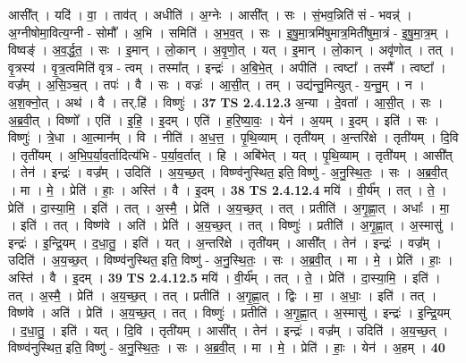 \documentclass[17pt]{extarticle}
\begin{document}
                  आसी᳚त् । यदि॑ । वा॒ । ताव॑त् । अधीति॑ । अ॒ग्नेः । आसी᳚त् ।   सः । सं॒भव॒न्निति॑ सं - भवन्न्॑ । अ॒ग्नीषोमा॒वित्य॒ग्नी - सोमौ᳚ । अ॒भि । समिति॑ । अ॒भ॒व॒त् । सः । इ॒षु॒मा॒त्रमि॑षुमात्र॒मिती॑षुमा॒त्रं - इ॒षु॒मा॒त्र॒म् । विष्वङ्॑ । अ॒व॒र्द्ध॒त॒ । सः । इ॒मान् । लो॒कान् । अ॒वृ॒णो॒त् । यत् । इ॒मान् । लो॒कान् । अवृ॑णोत् । तत् । वृ॒त्रस्य॑ । वृ॒त्र॒त्वमिति॑ वृत्र - त्वम् । तस्मा᳚त् । इन्द्रः॑ । अ॒बि॒भे॒त् । अपीति॑ । त्वष्टा᳚ । तस्मै᳚ । त्वष्टा᳚ । वज्र᳚म् । अ॒सि॒ञ्च॒त् । तपः॑ । वै । सः । वज्रः॑ । आ॒सी॒त् । तम् । उद्य॑न्तु॒मित्युत् -   य॒न्तु॒म् । न । अ॒श॒क्नो॒त् । अथ॑ । वै । तर्.हि॑ । विष्णुः॑ । \textbf{  37} \newline
                  \newline
                                \textbf{ TS 2.4.12.3} \newline
                  अ॒न्या । दे॒वता᳚ । आ॒सी॒त् । सः । अ॒ब्र॒वी॒त् । विष्णो᳚ । एति॑ । इ॒हि॒ । इ॒दम् । एति॑ । ह॒रि॒ष्या॒वः॒ । येन॑ । अ॒यम् । इ॒दम् । इति॑ । सः । विष्णुः॑ । त्रे॒धा । आ॒त्मान᳚म् । वि । नीति॑ । अ॒ध॒त्त॒ । पृ॒थि॒व्याम् । तृती॑यम् । अ॒न्तरि॑क्षे । तृती॑यम् । दि॒वि । तृती॑यम् । अ॒भि॒प॒र्या॒व॒र्तादित्य॑भि - प॒र्या॒व॒र्तात् । हि । अबि॑भेत् । यत् । पृ॒थि॒व्याम् । तृती॑यम् । आसी᳚त् । तेन॑ । इन्द्रः॑ । वज्र᳚म् । उदिति॑ । अ॒य॒च्छ॒त् । विष्ण्व॑नुस्थित॒ इति॒ विष्णु॑ - अ॒नु॒स्थि॒तः॒ । सः । अ॒ब्र॒वी॒त् । मा । मे॒ । प्रेति॑ । हाः॒ । अस्ति॑ । वै । इ॒दम् । \textbf{  38} \newline
                  \newline
                                \textbf{ TS 2.4.12.4} \newline
                  मयि॑ । वी॒र्य᳚म् । तत् । ते॒ । प्रेति॑ । दा॒स्या॒मि॒ । इति॑ ।   तत् । अ॒स्मै॒ । प्रेति॑ । अ॒य॒च्छ॒त् । तत् । प्रतीति॑ । अ॒गृ॒ह्णा॒त् । अधाः᳚ । मा॒ । इति॑ । तत् । विष्ण॑वे । अति॑ । प्रेति॑ । अ॒य॒च्छ॒त् । तत् । विष्णुः॑ । प्रतीति॑ । अ॒गृ॒ह्णा॒त् । अ॒स्मासु॑ । इन्द्रः॑ । इ॒न्द्रि॒यम् । द॒धा॒तु॒ । इति॑ । यत् । अ॒न्तरि॑क्षे । तृती॑यम् । आसी᳚त् । तेन॑ । इन्द्रः॑ । वज्र᳚म् । उदिति॑ । अ॒य॒च्छ॒त् । विष्ण्व॑नुस्थित॒ इति॒ विष्णु॑ - अ॒नु॒स्थि॒तः॒ । सः । अ॒ब्र॒वी॒त् । मा । मे॒ । प्रेति॑ । हाः॒ । अस्ति॑ । वै । इ॒दम् । \textbf{  39} \newline
                  \newline
                                \textbf{ TS 2.4.12.5} \newline
                  मयि॑ । वी॒र्य᳚म् । तत् । ते॒ । प्रेति॑ । दा॒स्या॒मि॒ । इति॑ । तत् । अ॒स्मै॒ । प्रेति॑ । अ॒य॒च्छ॒त् । तत् । प्रतीति॑ । अ॒गृ॒ह्णा॒त् । द्विः । मा॒ । अ॒धाः॒ । इति॑ । तत् । विष्ण॑वे । अति॑ । प्रेति॑ । अ॒य॒च्छ॒त् । तत् । विष्णुः॑ । प्रतीति॑ । अ॒गृ॒ह्णा॒त् । अ॒स्मासु॑ । इन्द्रः॑ । इ॒न्द्रि॒यम् । द॒धा॒तु॒ । इति॑ । यत् । दि॒वि । तृती॑यम् । आसी᳚त् । तेन॑ । इन्द्रः॑ । वज्र᳚म् । उदिति॑ । अ॒य॒च्छ॒त् । विष्ण्व॑नुस्थित॒ इति॒ विष्णु॑ - अ॒नु॒स्थि॒तः॒ । सः । अ॒ब्र॒वी॒त् । मा । मे॒ । प्रेति॑ । हाः॒ । येन॑ । अ॒हम् । \textbf{  40} \newline
\end{document}
